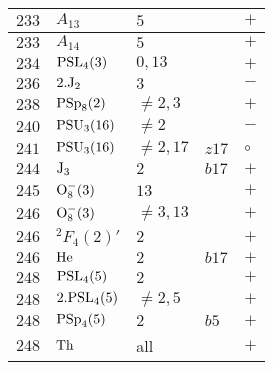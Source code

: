 \documentclass[a4paper, 11pt]{article}
\begin{document}
\begin{longtable}{lllll}
		$233$ & $A_{13}$ & $5$ &  & $+$ \\ \hline
		$233$ & $A_{14}$ & $5$ &  & $+$ \\ \hline
		$234$ & ${\rm PSL}_{4}(3)$ & $0,13$ &  & $+$ \\ \hline
		$236$ & $2.{\rm J}_2$ & $3$ &  & $-$ \\ \hline
		$238$ & ${\rm PSp}_{8}(2)$ & $\neq 2,3$ &  & $+$ \\ \hline
		$240$ & ${\rm PSU}_{3}(16)$ & $\neq 2$ &  & $-$ \\ \hline
		$241$ & ${\rm PSU}_{3}(16)$ & $\neq 2,17$ & $z17$ & $\circ$ \\ \hline
		$244$ & ${\rm J}_3$ & $2$ & $b17$ & $+$ \\ \hline
		$245$ & ${\rm O}_{8}^-(3)$ & $13$ &  & $+$ \\ \hline
		$246$ & ${\rm O}_{8}^-(3)$ & $\neq 3,13$ &  & $+$ \\ \hline
		$246$ & ${}^{2}F_{4}(2)'$ & $2$ &  & $+$ \\ \hline
		$246$ & ${\rm He}$ & $2$ & $b17$ & $+$ \\ \hline
		$248$ & ${\rm PSL}_{4}(5)$ & $2$ &  & $+$ \\ \hline
		$248$ & $2.{\rm PSL}_{4}(5)$ & $\neq 2,5$ &  & $+$ \\ \hline
		$248$ & ${\rm PSp}_{4}(5)$ & $2$ & $b5$ & $+$ \\ \hline
		$248$ & ${\rm Th}$ & all &  & $+$ \\ \hline
	\end{longtable}
\end{document}
